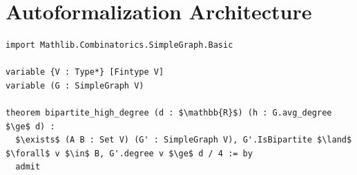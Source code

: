 \documentclass[11pt,a4paper]{article}
\begin{document}
\section{Autoformalization Architecture}
\begin{lstlisting}[basicstyle=\ttfamily\small, breaklines=true, mathescape=true]
import Mathlib.Combinatorics.SimpleGraph.Basic

variable {V : Type*} [Fintype V]
variable (G : SimpleGraph V)

theorem bipartite_high_degree (d : $\mathbb{R}$) (h : G.avg_degree $\ge$ d) :
  $\exists$ (A B : Set V) (G' : SimpleGraph V), G'.IsBipartite $\land$ $\forall$ v $\in$ B, G'.degree v $\ge$ d / 4 := by
  admit
\end{lstlisting}
\end{document}
